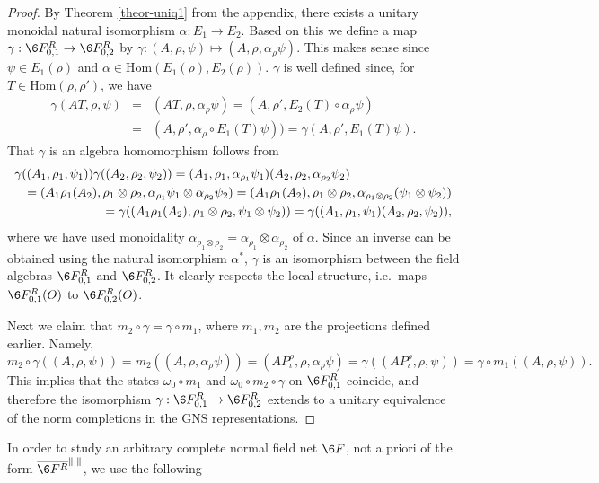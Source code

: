 \documentclass[12pt]{article}
\theoremstyle{definition}
\theoremstyle{definition}
\theoremstyle{remark}
\newcommand{\Hom}{\mathrm{Hom}}
\newcommand{\rarr}{\rightarrow}
\begin{document}
\begin{proof} By Theorem \ref{theor-uniq1} from the
  appendix, there exists a unitary monoidal natural
  isomorphism $\alpha: E_1\rarr E_2$. Based on this we
  define a map $\gamma:\6F^R_{0,1}\rarr\6F^R_{0,2}$ by
  $\gamma:(A,\rho,\psi)\mapsto(A,\rho,\alpha_\rho\psi)$. This
  makes sense since $\psi\in E_1(\rho)$ and
  $\alpha\in\Hom(E_1(\rho),E_2(\rho))$. $\gamma$ is
  well defined since, for $T\in\Hom(\rho,\rho')$, we
  have
\begin{eqnarray*} \gamma(AT,\rho,\psi)&=&(AT,\rho,\alpha_\rho\psi)=(A,\rho',E_2(T)\circ\alpha_\rho\psi)\\
  &=& (A,\rho',\alpha_\rho\circ E_1(T)\psi))=\gamma(A,\rho',E_1(T)\psi). \end{eqnarray*}
That $\gamma$ is an algebra homomorphism follows from
\begin{eqnarray*} \lefteqn{ \gamma((A_1,\rho_1,\psi_1))\gamma((A_2,\rho_2,\psi_2)) =
   (A_1,\rho_1,\alpha_{\rho_1}\psi_1)(A_2,\rho_2,\alpha_{\rho_2}\psi_2) } \\
   &&= (A_1\rho_1(A_2),\rho_1\otimes\rho_2,\alpha_{\rho_1}\psi_1\otimes\alpha_{\rho_2}\psi_2) 
   = (A_1\rho_1(A_2),\rho_1\otimes\rho_2,\alpha_{\rho_1\otimes\rho_2}(\psi_1\otimes\psi_2)) \\
   &&= \gamma((A_1\rho_1(A_2),\rho_1\otimes\rho_2,\psi_1\otimes\psi_2)) 
   = \gamma((A_1,\rho_1,\psi_1)(A_2,\rho_2,\psi_2)),
\end{eqnarray*}
where we have used monoidality $\alpha_{\rho_1\otimes\rho_2}=\alpha_{\rho_1}\otimes\alpha_{\rho_2}$
of $\alpha$. Since an inverse can be obtained using the natural isomorphism $\alpha^*$, $\gamma$ is
an isomorphism between the field algebras $\6F^R_{0,1}$ and $\6F^R_{0,2}$. It clearly respects the
local structure, i.e.\ maps $\6F^R_{0,1}(O)$ to $\6F^R_{0,2}(O)$.

Next we claim that $m_2\circ\gamma=\gamma\circ m_1$, where $m_1,m_2$ are the projections defined
earlier. Namely, 
\[ m_2\circ\gamma((A,\rho,\psi)) = m_2((A,\rho,\alpha_\rho\psi))
   =(AP^\rho_\iota,\rho,\alpha_\rho\psi)  =\gamma((AP^\rho_\iota,\rho,\psi))
  =\gamma\circ m_1((A,\rho,\psi)).
\]
This implies that the states $\omega_0\circ m_1$ and $\omega_0\circ m_2\circ\gamma$ on $\6F^R_{0,1}$
coincide, and therefore the isomorphism $\gamma:\6F^R_{0,1}\rarr\6F^R_{0,2}$ extends to a unitary
equivalence of the norm completions in the GNS representations.
\end{proof}

In order to study an arbitrary complete normal field net $\6F$, not a priori of the form
$\overline{\6F^R}^{\|\cdot\|}$, we use the following
\end{document}
